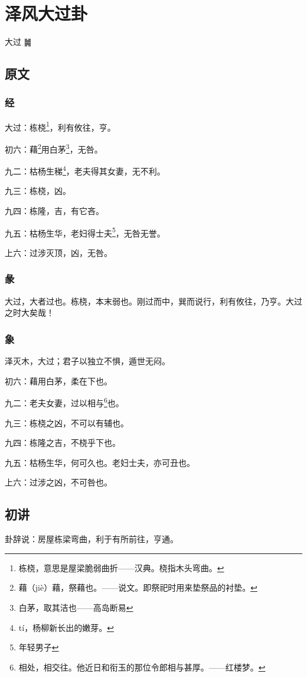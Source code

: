 \documentclass[12pt,oneside]{book}
\begin{document}
\chapter{泽风大过卦}
大过 {\Large ䷛}

\section{原文}

\subsection{经}
大过：栋桡\footnote{栋桡，意思是屋梁脆弱曲折——汉典。桡指木头弯曲。}，利有攸往，亨。

初六：藉\footnote{藉（jiè）藉，祭藉也。——说文。即祭祀时用来垫祭品的衬垫。}用白茅\footnote{白茅，取其洁也——高岛断易}，无咎。

九二：枯杨生稊\footnote{tí，杨柳新长出的嫩芽。}，老夫得其女妻，无不利。

九三：栋桡，凶。

九四：栋隆，吉，有它吝。

九五：枯杨生华，老妇得士夫\footnote{年轻男子}，无咎无誉。

上六：过涉灭顶，凶，无咎。

\subsection{彖}
大过，大者过也。栋桡，本末弱也。刚过而中，巽而说行，利有攸往，乃亨。大过之时大矣哉！

\subsection{象}
泽灭木，大过；君子以独立不惧，遁世无闷。

初六：藉用白茅，柔在下也。

九二：老夫女妻，过以相与\footnote{相处，相交往。他近日和衔玉的那位令郎相与甚厚。——红楼梦。}也。

九三：栋桡之凶，不可以有辅也。

九四：栋隆之吉，不桡乎下也。

九五：枯杨生华，何可久也。老妇士夫，亦可丑也。

上六：过涉之凶，不可咎也。

\section{初讲}
卦辞说：房屋栋梁弯曲，利于有所前往，亨通。
\end{document}
